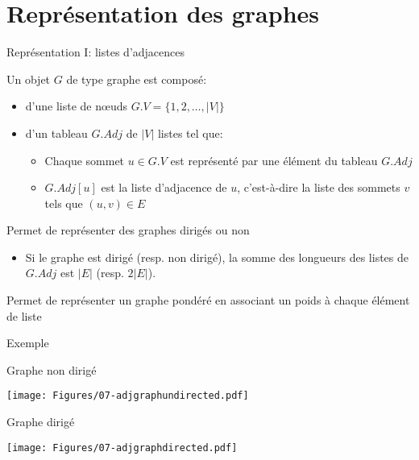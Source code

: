 \section{Représentation des graphes}

\begin{frame}{Représentation I: listes d'adjacences}

Un objet $G$ de type graphe est composé:
\begin{itemize}
\item d'une liste de n\oe uds $G.V=\{1,2,\ldots,|V|\}$
\item d'un tableau $G.Adj$ de $|V|$ listes tel que:
\begin{itemize}
\item Chaque sommet $u\in G.V$ est représenté par une élément du tableau $G.Adj$
\item $G.Adj[u]$ est la liste d'adjacence de $u$, c'est-à-dire la
  liste des sommets $v$ tels que $(u,v)\in E$
\end{itemize}
\end{itemize}

\bigskip

Permet de représenter des graphes dirigés ou non
\begin{itemize}
\item Si le graphe est dirigé (resp. non dirigé), la somme des longueurs des listes de $G.Adj$ est 
$|E|$ (resp. $2|E|$).
\end{itemize}

\bigskip

Permet de représenter un graphe pondéré en associant un poids à chaque
élément de liste

\end{frame}

\begin{frame}{Exemple}

Graphe non dirigé
\centerline{\texttt{[image: Figures/07-adjgraphundirected.pdf]}}

\bigskip

Graphe dirigé
\centerline{\texttt{[image: Figures/07-adjgraphdirected.pdf]}}

\end{frame}

